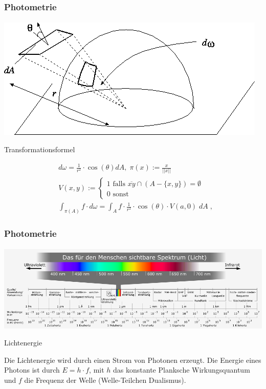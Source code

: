 \documentclass{beamer}
\begin{document}
\begin{frame}
    \frametitle{Photometrie}
\framesubtitle{}
\begin{center}
\includegraphics[scale=0.30]{images/solidangle}
\end{center}

\begin{block}{Transformationsformel}


\begin{align}
& d\omega =  \frac{1}{r^2} \cdot  \cos(\theta) dA, \;  \pi(x):=  \frac{x}{||x||}  \\
& V(x,y) := \begin{cases}
1 \text{ falls } \overline{xy} \cap (A -\{x,y\}) = \emptyset \\
0 \text{ sonst }
\end{cases} \\
& \int_{\pi(A)} f \cdot   d\omega  =  \int_{A} f  \cdot \frac{1}{r^2} \cdot  \cos(\theta) \cdot V(a, 0)  \; dA \; ,
\end{align}


\end{block}
\end{frame}


\begin{frame}
    \frametitle{Photometrie}
\framesubtitle{}
\begin{center}

    \includegraphics[width=1.0\textwidth]{images/Electromagnetic_spectrum_c.png}
\end{center}
\begin{block}{Lichtenergie}

Die Lichtenergie wird durch einen Strom von Photonen erzeugt. Die Energie eines Photons ist 
durch $E=h \cdot f$, mit  $h$ das konstante Planksche Wirkungsquantum und $f$ die Frequenz der Welle (Welle-Teilchen Dualismus).  


\end{block}
\end{frame}
\end{document}
